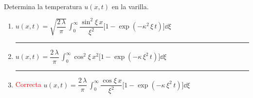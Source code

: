 \begin{enumerate}
\begin{align*}
\end{align*}
Determina la temperatura $u(x, t)$ en la varilla.
\begin{enumerate}[label=3.\alph*)]
\setlength\itemsep{2em}
\item $u(x, t) = \sqrt{\dfrac{2 \, \lambda}{\pi}} \, \displaystyle \int_{0}^{\infty} \dfrac{\sin^{2} \xi \, x}{\xi^{2}} \big[ 1 - \exp(-\kappa^{2} \, \xi \, t)\big] \dd{\xi}$ \hrule
\item $u(x, t) = \dfrac{2 \, \lambda}{\pi} \, \displaystyle \int_{0}^{\infty} \cos^{2} \xi \, x^{2} \big[ 1 - \exp(-\kappa \, \xi^{2} \, t)\big] \dd{\xi}$ \hrule
\item \textcolor{red}{Correcta} $u(x, t) = \dfrac{2 \, \lambda}{\pi} \, \displaystyle \int_{0}^{\infty} \dfrac{\cos \xi \, x}{\xi^{2}} \big[ 1 - \exp(-\kappa \, \xi^{2} \, t)\big] \dd{\xi}$
\end{enumerate}    
\end{enumerate}

